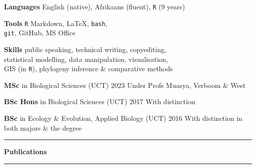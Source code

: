 \documentclass[10pt]{article}
\begin{document}


\begin{multicols}{2} %

\textbf{Languages}
  \hfill
    English {\small (native)},
    Afrikaans {\small (fluent)},
    \texttt{R} {\small (9 years)}

\textbf{Tools}
  \hfill \texttt{R} Markdown, {\selectfont \LaTeX}, \texttt{bash}, \\
  \hfill \texttt{git}, GitHub, MS Office

\textbf{Skills} {\small
  \hfill public speaking, technical writing, copyediting, \\
  \hfill statistical modelling, data manipulation, visualisation, \\
  \hfill GIS (in \texttt{R}), phylogeny inference \& comparative methods}

\columnbreak

\begin{hangparas}{2em}{1}

  \textbf{MSc} in Biological Sciences (UCT)                     \hfill 2023 \break
  Under Profs Muasya, Verboom \& West
  
  \textbf{BSc Hons} in Biological Sciences (UCT)                \hfill 2017 \break
  With distinction
  
  \textbf{BSc} in Ecology \& Evolution, Applied Biology (UCT)   \hfill 2016 \break
  With distinction in both majors \& the degree
  
\end{hangparas}


\end{multicols} %

\hrule

\vskip5pt

\textbf{\large Publications} %

\vskip1pt



\vskip10pt

\hrule
\end{document}
